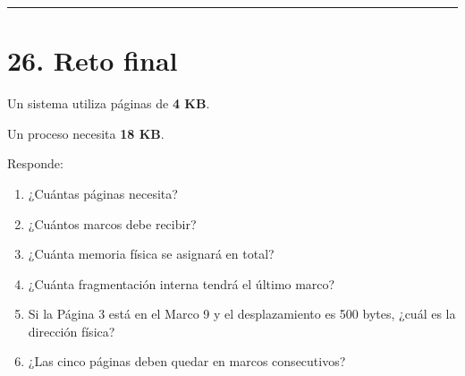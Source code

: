 \documentclass[
  spanish,
  letterpaper,
]{scrbook}
\providecommand{\tightlist}{%
  \setlength{\itemsep}{0pt}\setlength{\parskip}{0pt}}
\begin{document}
\begin{center}\rule{0.5\linewidth}{0.5pt}\end{center}


\chapter{26. Reto final}\label{reto-final}

Un sistema utiliza páginas de \textbf{4 KB}.

Un proceso necesita \textbf{18 KB}.

Responde:

\begin{enumerate}
\def\labelenumi{\arabic{enumi}.}
\tightlist
\item
  ¿Cuántas páginas necesita?
\item
  ¿Cuántos marcos debe recibir?
\item
  ¿Cuánta memoria física se asignará en total?
\item
  ¿Cuánta fragmentación interna tendrá el último marco?
\item
  Si la Página 3 está en el Marco 9 y el desplazamiento es 500 bytes,
  ¿cuál es la dirección física?
\item
  ¿Las cinco páginas deben quedar en marcos consecutivos?
\end{enumerate}
\end{document}
